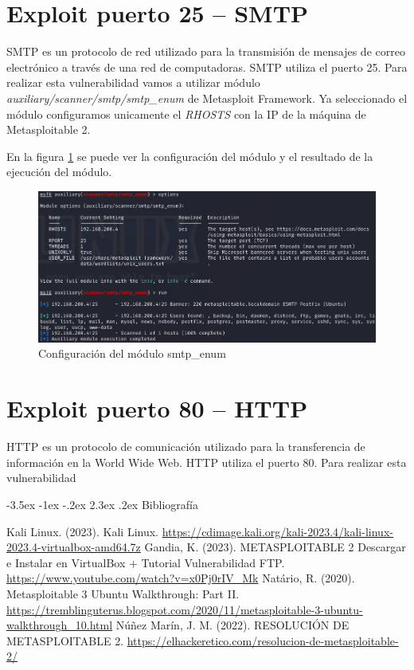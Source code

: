 \documentclass[11pt]{report}
\makeatletter
\renewcommand\chapter{\@startsection{chapter}{0}{\z@}%
    {-3.5ex \@plus -1ex \@minus -.2ex}%
    {2.3ex \@plus.2ex}%
    {\normalfont\Large\bfseries}}
\makeatother
\begin{document}
\section{Exploit puerto 25 – SMTP}
SMTP es un protocolo de red utilizado para la transmisión de mensajes de correo electrónico a través de una red de computadoras. SMTP utiliza el puerto 25. Para realizar esta vulnerabilidad
vamos a utilizar módulo \emph{auxiliary/scanner/smtp/smtp\_enum} de Metasploit Framework. Ya seleccionado el módulo configuramos unicamente el \emph{RHOSTS} con la IP de la máquina de Metasploitable 2.

En la figura \ref{fig:Configuración del módulo smtp_enum} se puede ver la configuración del módulo y el resultado de la ejecución del módulo.
\begin{figure}[H]
  \centering
  \includegraphics[scale=0.6]{img/smtp.png}
  \caption{Configuración del módulo smtp\_enum}
  \label{fig:Configuración del módulo smtp_enum}
\end{figure}

\section{Exploit puerto 80 – HTTP}
HTTP es un protocolo de comunicación utilizado para la transferencia de información en la World Wide Web. HTTP utiliza el puerto 80. Para realizar esta vulnerabilidad



\newpage

\chapter{Bibliografía} %
\begin{thebibliography}{99}
   Kali Linux. (2023). Kali Linux. \url{https://cdimage.kali.org/kali-2023.4/kali-linux-2023.4-virtualbox-amd64.7z}
   Gandia, K. (2023). METASPLOITABLE 2 Descargar e Instalar en VirtualBox + Tutorial Vulnerabilidad FTP. \url{https://www.youtube.com/watch?v=x0Pj0rIV_Mk}
   Natário, R. (2020). Metasploitable 3 Ubuntu Walkthrough: Part II. \url{https://tremblinguterus.blogspot.com/2020/11/metasploitable-3-ubuntu-walkthrough_10.html}
   Núñez Marín, J. M. (2022). RESOLUCIÓN DE METASPLOITABLE 2. \url{https://elhackeretico.com/resolucion-de-metasploitable-2/}
\end{thebibliography}
\end{document}
